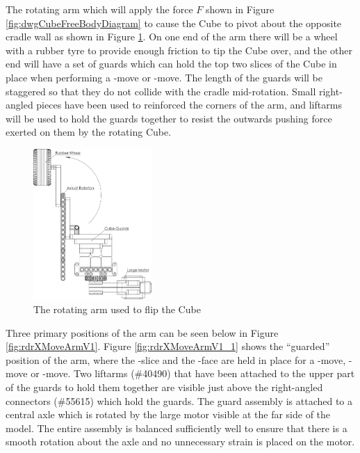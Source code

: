 \documentclass{report}
\newcommand{\legopiece}[1]{(\##1)}
\newcommand{\face}[1]{\uppercase{\texttt{\formatmovesnospace{#1}}}-face}
\newcommand{\move}[1]{\uppercase{\texttt{\formatmovesnospace{#1}}}-move}
\newcommand{\slice}[1]{\uppercase{\texttt{\formatmovesnospace{#1}}}-slice}
\begin{document}
    The rotating arm which will apply the force $F$ shown in Figure \ref{fig:dwgCubeFreeBodyDiagram} to cause the Cube to pivot about the opposite cradle wall as shown in Figure \ref{fig:dwgRotatingArm}. On one end of the arm there will be a wheel with a rubber tyre to provide enough friction to tip the Cube over, and the other end will have a set of guards which can hold the top two slices of the Cube in place when performing a \move{D} or \move{d'}. The length of the guards will be staggered so that they do not collide with the cradle mid-rotation. Small right-angled pieces have been used to reinforced the corners of the arm, and liftarms will be used to hold the guards together to resist the outwards pushing force exerted on them by the rotating Cube.
    
    \begin{figure}[H]
    	\centering
   		\includegraphics[width=0.4\textwidth]{Resources/Images/dwgRotatingArm.png}
   		\caption{The rotating arm used to flip the Cube}
   		\label{fig:dwgRotatingArm}
    \end{figure}

	Three primary positions of the arm can be seen below in Figure \ref{fig:rdrXMoveArmV1}. Figure \ref{fig:rdrXMoveArmV1_1} shows the \enquote{guarded} position of the arm, where the \slice{l-r} and the \face{U} are held in place for a \move{D}, \move{D'} or \move{D2}. Two liftarms \legopiece{40490} that have been attached to the upper part of the guards to hold them together are visible just above the right-angled connectors \legopiece{55615} which hold the guards. The guard assembly is attached to a central axle which is rotated by the large motor visible at the far side of the model. The entire assembly is balanced sufficiently well to ensure that there is a smooth rotation about the axle and no unnecessary strain is placed on the motor.
\end{document}
